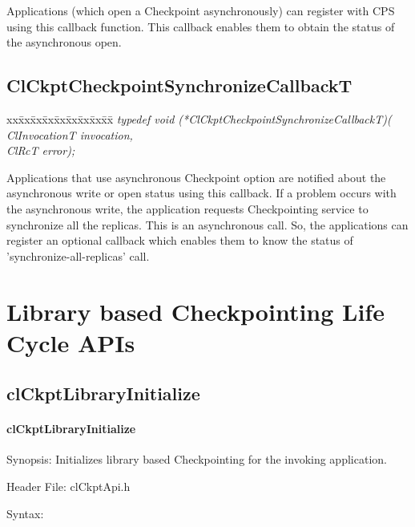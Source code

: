 \begin{flushleft}
Applications (which open a Checkpoint asynchronously) can register with CPS using this callback function. This callback enables them to obtain the 
status of the asynchronous open.


\subsection{ClCkptCheckpointSynchronizeCallbackT}
\begin{tabbing}
xx\=xx\=xx\=xx\=xx\=xx\=xx\=xx\=xx\=\kill
\textit{typedef void (*ClCkptCheckpointSynchronizeCallbackT)(}\\
\>\>\>\>\textit{ClInvocationT invocation,}\\
\>\>\>\>\textit{ClRcT                   error);}
\end{tabbing}
Applications that use asynchronous Checkpoint option are notified about the asynchronous write or open status using this callback. If a problem 
occurs with the asynchronous write, the application requests Checkpointing service to synchronize all the replicas. This is an asynchronous call. So, the
applications can register an optional callback which enables them to know the status of 'synchronize-all-replicas' call. 


\newpage

\section{Library based Checkpointing Life Cycle APIs}
\subsection{clCkptLibraryInitialize}
\hypertarget{pageckpt101}{}\paragraph{cl\-Ckpt\-Library\-Initialize}\label{pageckpt101}
\begin{Desc}
\item[Synopsis:]Initializes library based Checkpointing for the invoking application.\end{Desc}
\begin{Desc}
\item[Header File:]clCkptApi.h\end{Desc}
\begin{Desc}
\item[Syntax:]


\end{Desc}
\end{flushleft}
